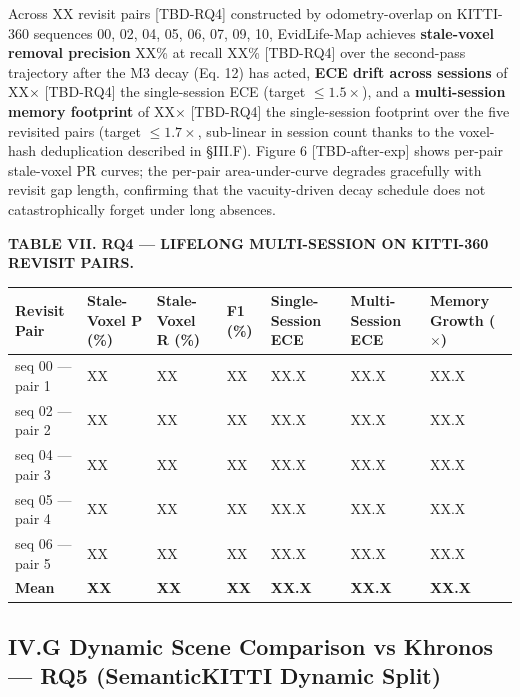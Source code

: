 \documentclass[
]{article}
\newcounter{none} %
\begin{document}
Across XX revisit pairs {[}TBD-RQ4{]} constructed by odometry-overlap on
KITTI-360 sequences 00, 02, 04, 05, 06, 07, 09, 10, EvidLife-Map
achieves \textbf{stale-voxel removal precision} XX\% at recall XX\%
{[}TBD-RQ4{]} over the second-pass trajectory after the M3 decay (Eq.
12) has acted, \textbf{ECE drift across sessions} of XX× {[}TBD-RQ4{]}
the single-session ECE (target \(\le 1.5\times\)), and a
\textbf{multi-session memory footprint} of XX× {[}TBD-RQ4{]} the
single-session footprint over the five revisited pairs (target
\(\le 1.7\times\), sub-linear in session count thanks to the voxel-hash
deduplication described in §III.F). Figure 6 {[}TBD-after-exp{]} shows
per-pair stale-voxel PR curves; the per-pair area-under-curve degrades
gracefully with revisit gap length, confirming that the vacuity-driven
decay schedule does not catastrophically forget under long absences.

\textbf{TABLE VII. RQ4 --- LIFELONG MULTI-SESSION ON KITTI-360 REVISIT
PAIRS.}

{\def\LTcaptype{none} %
\begin{longtable}[]{@{}lllllll@{}}
\toprule\noalign{}
Revisit Pair & Stale-Voxel P (\%) & Stale-Voxel R (\%) & F1 (\%) &
Single-Session ECE & Multi-Session ECE & Memory Growth (\(\times\)) \\
\midrule\noalign{}
\endhead
\bottomrule\noalign{}
\endlastfoot
seq 00 --- pair 1 & XX & XX & XX & XX.X & XX.X & XX.X \\
seq 02 --- pair 2 & XX & XX & XX & XX.X & XX.X & XX.X \\
seq 04 --- pair 3 & XX & XX & XX & XX.X & XX.X & XX.X \\
seq 05 --- pair 4 & XX & XX & XX & XX.X & XX.X & XX.X \\
seq 06 --- pair 5 & XX & XX & XX & XX.X & XX.X & XX.X \\
\textbf{Mean} & \textbf{XX} & \textbf{XX} & \textbf{XX} & \textbf{XX.X}
& \textbf{XX.X} & \textbf{XX.X} \\
\end{longtable}
}

\subsection{IV.G Dynamic Scene Comparison vs Khronos --- RQ5
(SemanticKITTI Dynamic
Split)}\label{ivg-dynamic-scene-comparison-vs-khronos--rq5-semantickitti-dynamic-split}
\end{document}
